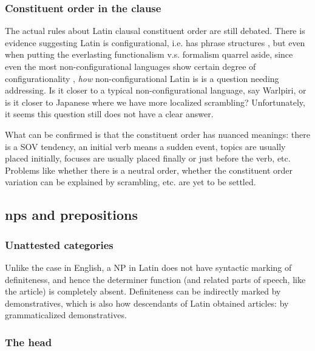 \documentclass{article}
\begin{document}
\subsubsection{Constituent order in the clause}\label{sec:constituent-order-abs}

The actual rules about Latin clausal constituent order are still debated.
There is evidence suggesting Latin is configurational, 
i.e. has phrase structures \citep{danckaert2017development},
but even when putting the everlasting functionalism v.s. formalism quarrel aside,
since even the most non-configurational languages show certain degree of configurationality 
\citep[among others]{niedzielski2017clausal,morris2018evidence,legate2002warlpiri},
\emph{how} non-configurational Latin is is a question needing addressing.
Is it closer to a typical non-configurational language, say Warlpiri, 
or is it closer to Japanese where we have more localized scrambling?
Unfortunately, it seems this question still does not have a clear answer.

What can be confirmed is that the constituent order has nuanced meanings:
there is a SOV tendency,
an initial verb means a sudden event,
topics are usually placed initially,
focuses are usually placed finally or just before the verb, etc.
Problems like whether there is a neutral order,
whether the constituent order variation can be explained by scrambling, etc. are yet to be settled.

\subsection{\Acl{np}s and prepositions}\label{sec:np-abs}

\subsubsection{Unattested categories}

Unlike the case in English, a NP in Latin does not have syntactic marking of definiteness,
and hence the determiner function (and related parts of speech, like the article) is completely absent.
Definiteness can be indirectly marked by demonstratives,
which is also how descendants of Latin obtained articles: by grammaticalized demonstratives.

\subsubsection{The head}\label{sec:np-head-abs}
\end{document}
